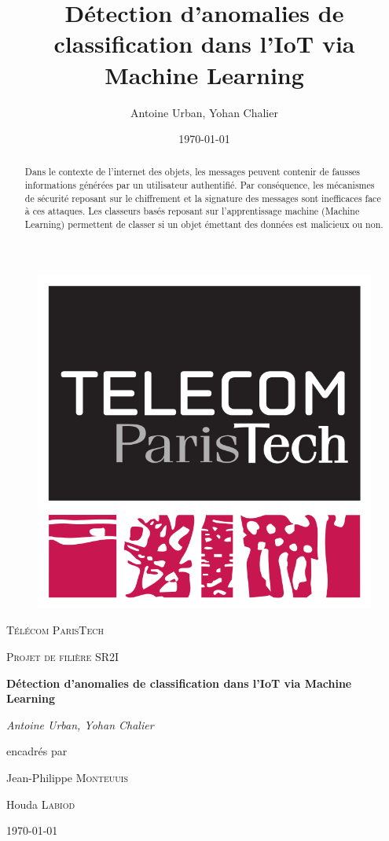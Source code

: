 \documentclass[a4paper]{report}
\title{Détection d'anomalies de classification dans l'IoT via Machine Learning}
\author{Antoine Urban, Yohan Chalier}
\date{\today}
\begin{document}
\begin{titlepage}
	\centering
	\vspace{1cm}
	\begin{figure}
	\centering
	\includegraphics[scale=0.2]{img/logo_TPT.png}
	\end{figure}
	\vspace{1cm}
	{\scshape\LARGE Télécom ParisTech \par}
	\vspace{1cm}
	{\scshape\Large Projet de filière SR2I \par}
	\vspace{1.5cm}
	{\huge\bfseries Détection d'anomalies de classification dans l'IoT via Machine Learning\par}
	\vspace{2cm}
	{\Large\itshape Antoine Urban, Yohan Chalier \par}
	\vfill
	encadrés par\par
	Jean-Philippe \textsc{Monteuuis}\par
	Houda \textsc{Labiod}
	\vfill

	{\large \today\par}
\end{titlepage}

\begin{abstract}
Dans le contexte de l'internet des objets, les messages peuvent contenir de fausses informations générées par un utilisateur authentifié. Par conséquence, les mécanismes de sécurité reposant sur le chiffrement et la signature des messages sont inefficaces face à ces attaques. Les classeurs basés reposant sur l'apprentissage machine (Machine Learning) permettent de classer si un objet émettant des données est malicieux ou non.
\end{abstract}
\end{document}
